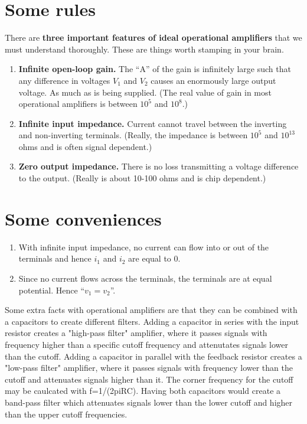 \documentclass[11pt]{book}
\begin{document}
\section{Some rules}
There are \textbf{three important features of ideal operational amplifiers} that we must understand thoroughly. These are things worth stamping in your brain.

\begin{enumerate}
	\item \textbf{Infinite open-loop gain.} The ``A'' of the gain is infinitely large such that any difference in voltages $V_1$ and $V_2$ causes an enormously large output voltage. As much as is being supplied. (The real value of gain in most operational amplifiers is between $10^{5}$ and $10^8$.)
	\item \textbf{Infinite input impedance.} Current cannot travel between the inverting and non-inverting terminals. (Really, the impedance is between $10^5$ and $10^13$ ohms and is often signal dependent.)
	\item \textbf{Zero output impedance.} There is no loss transmitting a voltage difference to the output. (Really is about 10-100 ohms and is chip dependent.)
\end{enumerate}

\section{Some conveniences}
\begin{enumerate}
	\item With infinite input impedance, no current can flow into or out of the terminals and hence $i_1$ and $i_2$ are equal to 0.
	\item Since no current flows across the terminals, the terminals are at equal potential. Hence ``$v_1 = v_2$''.
\end{enumerate}

Some extra facts with operational amplifiers are that they can be combined with a capacitors to create different filters. Adding a capacitor in series with the input resistor creates a "high-pass filter" amplifier, where it passes signals with frequency higher than a specific cutoff frequency and attenutates signals lower than the cutoff. Adding a capacitor in parallel with the feedback resistor creates a "low-pass filter" amplifier, where it passes signals with frequency lower than the cutoff and attenuates signals higher than it. The corner frequency for the cutoff may be caulcated with f=1/(2piRC). Having both capacitors would create a band-pass filter which attenuates signals lower than the lower cutoff and higher than the upper cutoff frequencies.
\end{document}
